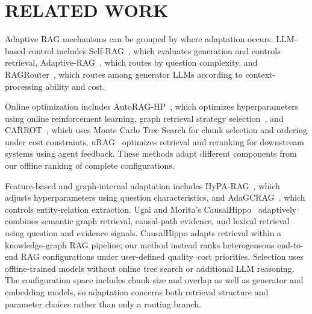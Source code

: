 \section{\uppercase{Related Work}} \label{sec2}
Adaptive RAG mechanisms can be grouped by where adaptation occurs. LLM-based control includes Self-RAG~\cite{Asai23}, which evaluates generation and controls retrieval, Adaptive-RAG~\cite{Jeong24}, which routes by question complexity, and RAGRouter~\cite{zhang2025ragrouter}, which routes among generator LLMs according to context-processing ability and cost.

Online optimization includes AutoRAG-HP~\cite{fu24}, which optimizes hyperparameters using online reinforcement learning, graph retrieval strategy selection~\cite{Tang25}, and CARROT~\cite{wang2026carrot}, which uses Monte Carlo Tree Search for chunk selection and ordering under cost constraints. uRAG~\cite{salemi2024urag} optimizes retrieval and reranking for downstream systems using agent feedback. These methods adapt different components from our offline ranking of complete configurations.

Feature-based and graph-internal adaptation includes HyPA-RAG~\cite{Rishi25}, which adjusts hyperparameters using question characteristics, and AdaGCRAG~\cite{zhang2025adagcrag}, which controls entity-relation extraction. Ugai and Morita's CausalHippo~\cite{UgaiMorita2026CausalHippo} adaptively combines semantic graph retrieval, causal-path evidence, and lexical retrieval using question and evidence signals. CausalHippo adapts retrieval within a knowledge-graph RAG pipeline; our method instead ranks heterogeneous end-to-end RAG configurations under user-defined quality--cost priorities. Selection uses offline-trained models without online tree search or additional LLM reasoning. The configuration space includes chunk size and overlap as well as generator and embedding models, so adaptation concerns both retrieval structure and parameter choices rather than only a routing branch.
